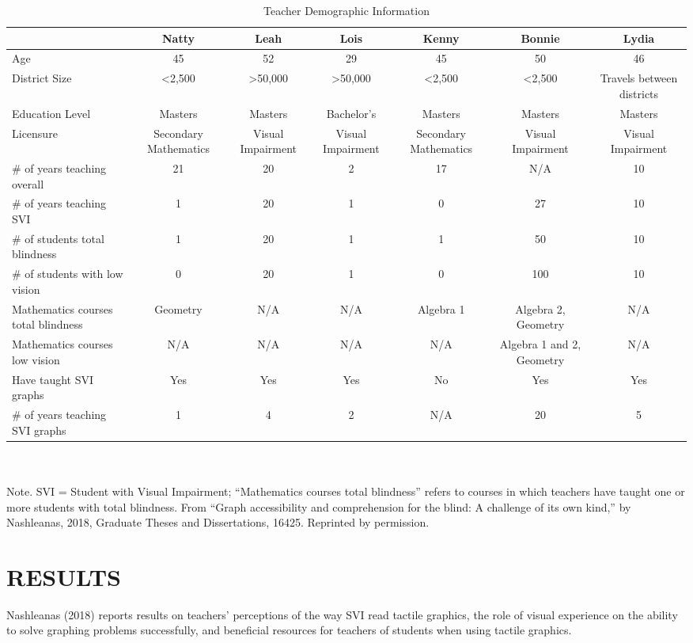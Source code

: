 \documentclass[11.5pt]{sig-alternate} %
\begin{document}
\begin{large}
\begin{table}[!h]
\caption{Teacher Demographic Information}
\begin{tabular}{lcccccc}
    & \textbf{Natty} & \textbf{Leah} & \textbf{Lois} & \textbf{Kenny} & \textbf{Bonnie} & \textbf{Lydia} \\ \hline
Age & 45 & 52 & 29 & 45 & 50 & 46 \\
District Size & \textless{}2,500 & \textgreater{}50,000 & \textgreater{}50,000 & \textless{}2,500 & \textless{}2,500          & Travels between districts \\
Education Level & Masters & Masters & Bachelor’s & Masters & Masters & Masters \\
Licensure & Secondary Mathematics & Visual Impairment & Visual Impairment & Secondary Mathematics & Visual Impairment         & Visual Impairment \\
\# of years teaching overall & 21 & 20 & 2 & 17 & N/A & 10 \\
\# of years teaching SVI & 1 & 20 & 1 & 0 & 27 & 10 \\
\#   of students total blindness & 1 & 20 & 1 & 1 & 50 & 10 \\
\#   of students with low vision & 0 & 20 & 1 & 0 & 100 & 10 \\
Mathematics courses total blindness & Geometry & N/A & N/A & Algebra 1 & Algebra 2, Geometry & N/A \\
Mathematics courses low vision & N/A & N/A & N/A  & N/A & Algebra 1 and 2, Geometry & N/A \\
Have taught SVI graphs & Yes & Yes & Yes & No & Yes & Yes \\
\# of years teaching SVI graphs & 1 & 4 & 2 & N/A & 20 & 5 \\                     
\end{tabular}
\justifying
\\
\\
Note. SVI = Student with Visual Impairment; “Mathematics courses total blindness” refers to courses in which teachers have taught one or more students with total blindness. From “Graph accessibility and comprehension for the blind: A challenge of its own kind,” by Nashleanas, 2018, Graduate Theses and Dissertations, 16425. Reprinted by permission.
\end{table}

\section*{RESULTS}
Nashleanas (2018) reports results on teachers’ perceptions of the way SVI read tactile graphics, the role of visual experience on the ability to solve graphing problems successfully, and beneficial resources for teachers of students when using tactile graphics.
 

\end{large}
\end{document}
